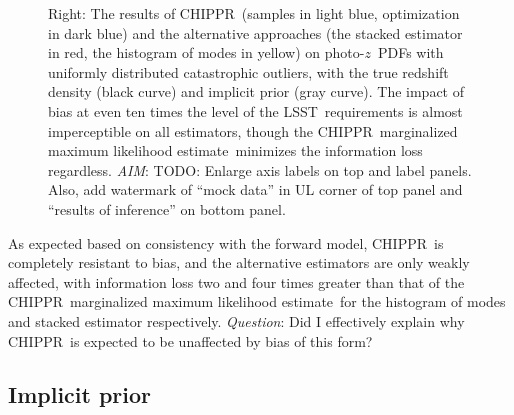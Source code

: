 \documentclass[iop]{emulateapj}
\newcommand{\todo}[3]{{\color{#2}\emph{#1}: #3}}
\newcommand{\aim}[1]{\todo{AIM}{red}{#1}}
\newcommand{\que}[1]{\todo{Question}{cyan}{#1}}
\newcommand{\project}[1]{\textsc{#1}}
\newcommand{\lsst}{\project{LSST}}
\newcommand{\Chippr}{\project{CHIPPR}}%
\newcommand{\pz}{photo-$z$}
\newcommand{\pzpdf}{\pz\ PDF}%
\newcommand{\mmle}{marginalized maximum likelihood estimate}%
\begin{document}
\begin{figure}
\begin{center}
{		Right: The results of \Chippr\ (samples in light blue, optimization in dark blue) and the alternative approaches (the stacked estimator in red, the histogram of modes in yellow) on \pzpdf s with uniformly distributed catastrophic outliers, with the true redshift density (black curve) and implicit prior (gray curve).
		The impact of bias at even ten times the level of the \lsst\ requirements is almost imperceptible on all estimators, though the \Chippr\ \mmle\ minimizes the information loss regardless.
		\aim{TODO: Enlarge axis labels on top and label panels.
		Also, add watermark of ``mock data'' in UL corner of top panel and ``results of inference'' on bottom panel.}
	}
	\label{fig:bias}
	\end{center}
\end{figure}

As expected based on consistency with the forward model, \Chippr\ is completely resistant to bias, and the alternative estimators are only weakly affected, with information loss two and four times greater than that of the \Chippr\ \mmle\ for the histogram of modes and stacked estimator respectively.
\que{Did I effectively explain why \Chippr\ is expected to be unaffected by bias of this form?}

\subsection{Implicit prior}
\label{sec:interim}
\end{document}
